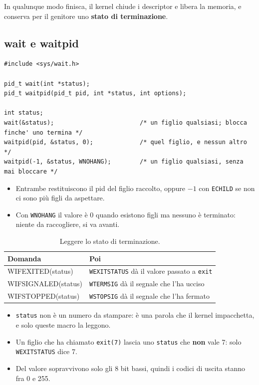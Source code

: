 In qualunque modo finisca, il kernel chiude i descriptor e libera la memoria, e conserva per il genitore uno \textbf{stato
di terminazione}.

\subsection{wait e waitpid}

\begin{lstlisting}[language={[POSIX]C}, style=wnumbers]
#include <sys/wait.h>

pid_t wait(int *status);
pid_t waitpid(pid_t pid, int *status, int options);

int status;
wait(&status);                        /* un figlio qualsiasi; blocca finche' uno termina */
waitpid(pid, &status, 0);             /* quel figlio, e nessun altro */
waitpid(-1, &status, WNOHANG);        /* un figlio qualsiasi, senza mai bloccare */
\end{lstlisting}

\begin{itemize}
    \item Entrambe restituiscono il pid del figlio raccolto, oppure $-1$ con \texttt{ECHILD} se non ci sono più figli da
          aspettare.
    \item Con \texttt{WNOHANG} il valore è 0 quando esistono figli ma nessuno è terminato: niente da raccogliere, si va avanti.
\end{itemize}

\begin{table}[H]
\centering
\begin{tabular}{>{\ttfamily}l l}
\toprule
\normalfont\textbf{Domanda} & \textbf{Poi} \\
\midrule
WIFEXITED(status)   & \texttt{WEXITSTATUS} dà il valore passato a \texttt{exit} \\
WIFSIGNALED(status) & \texttt{WTERMSIG} dà il segnale che l'ha ucciso \\
WIFSTOPPED(status)  & \texttt{WSTOPSIG} dà il segnale che l'ha fermato \\
\bottomrule
\end{tabular}
\caption{Leggere lo stato di terminazione.}
\end{table}

\begin{itemize}
    \item \texttt{status} non è un numero da stampare: è una parola che il kernel impacchetta, e solo queste macro la leggono.
    \item Un figlio che ha chiamato \texttt{exit(7)} lascia uno \texttt{status} che \textbf{non} vale 7: solo
          \texttt{WEXITSTATUS} dice 7.
    \item Del valore sopravvivono solo gli 8 bit bassi, quindi i codici di uscita stanno fra 0 e 255.
\end{itemize}

